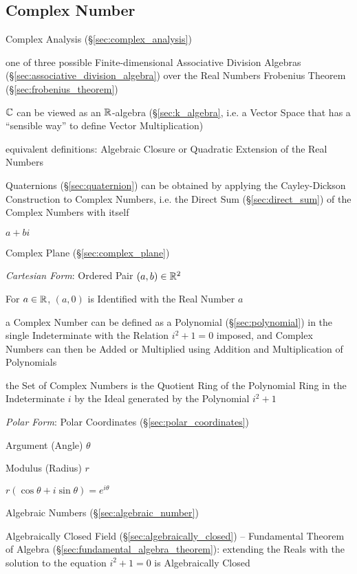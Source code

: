 \subsection{Complex Number}\label{sec:complex_number}

\fist Complex Analysis (\S\ref{sec:complex_analysis})

one of three possible Finite-dimensional Associative Division Algebras
(\S\ref{sec:associative_division_algebra}) over the Real Numbers \fist
Frobenius Theorem (\S\ref{sec:frobenius_theorem})

$\mathbb{C}$ can be viewed as an $\mathbb{R}$-algebra (\S\ref{sec:k_algebra}, i.e. a
Vector Space that has a ``sensible way'' to define Vector Multiplication)

equivalent definitions: Algebraic Closure or Quadratic Extension of
the Real Numbers

Quaternions (\S\ref{sec:quaternion}) can be obtained by applying the
Cayley-Dickson Construction to Complex Numbers, i.e. the Direct Sum
(\S\ref{sec:direct_sum}) of the Complex Numbers with itself

$a + bi$

Complex Plane (\S\ref{sec:complex_plane})

\emph{Cartesian Form}: Ordered Pair $(a,b) \in \mathbb{R}^2$

For $a \in \mathbb{R}$, $(a,0)$ is Identified with the Real Number $a$

a Complex Number can be defined as a Polynomial (\S\ref{sec:polynomial}) in the
single Indeterminate with the Relation $i^2 + 1 = 0$ imposed, and Complex
Numbers can then be Added or Multiplied using Addition and Multiplication of
Polynomials

the Set of Complex Numbers is the Quotient Ring of the Polynomial Ring in the
Indeterminate $i$ by the Ideal generated by the Polynomial $i^2 + 1$

\emph{Polar Form}: Polar Coordinates (\S\ref{sec:polar_coordinates})

Argument (Angle) $\theta$

Modulus (Radius) $r$

$r(\cos\theta + i \sin\theta) = e^{i\theta}$

Algebraic Numbers (\S\ref{sec:algebraic_number})

Algebraically Closed Field (\S\ref{sec:algebraically_closed}) -- Fundamental
Theorem of Algebra (\S\ref{sec:fundamental_algebra_theorem}): extending the
Reals with the solution to the equation $i^2 + 1 = 0$ is Algebraically Closed

